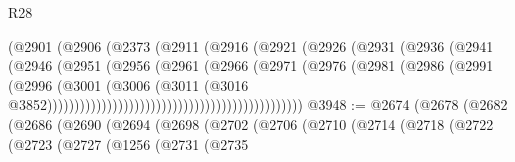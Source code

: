 \begin{lexlean}{R28}
\begin{coremodule}
                                                (@2901
                                                  (@2906
                                                    (@2373
                                                      (@2911
                                                        (@2916
                                                          (@2921
                                                            (@2926
                                                              (@2931
                                                                (@2936
                                                                  (@2941
                                                                    (@2946
                                                                      (@2951
                                                                        (@2956
                                                                          (@2961
                                                                            (@2966
                                                                              (@2971
                                                                                (@2976
                                                                                  (@2981
                                                                                    (@2986
                                                                                      (@2991
                                                                                        (@2996
                                                                                          (@3001
                                                                                            (@3006
                                                                                              (@3011
                                                                                                (@3016
                                                                                                  @3852)))))))))))))))))))))))))))))))))))))))))))))))
@3948 := @2674
    (@2678
      (@2682
        (@2686
          (@2690
            (@2694
              (@2698
                (@2702
                  (@2706
                    (@2710
                      (@2714
                        (@2718
                          (@2722
                            (@2723
                              (@2727
                                (@1256
                                  (@2731
                                    (@2735

\end{coremodule}
\end{lexlean}
